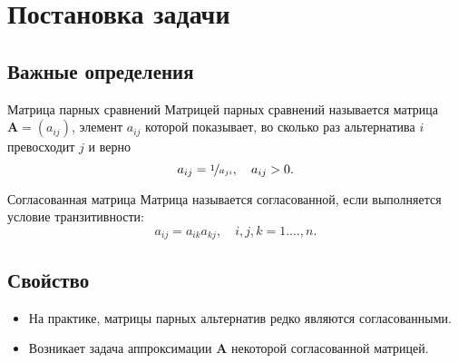 \documentclass[ucs, notheorems, handout]{beamer}
\begin{document}
\section{Постановка задачи}
\subsection{Важные определения}
\begin{frame}
	\begin{block}{Матрица парных сравнений}
		Матрицей парных сравнений называется матрица $\boldsymbol{A} = (a_{ij})$, элемент $a_{ij}$ которой показывает, во сколько раз альтернатива $i$ превосходит $j$ и верно
		\[
		a_{ij} = \nicefrac{1}{a_{ji}}, \quad a_{ij} > 0.
		\]
	\end{block}
	\begin{block}{Согласованная матрица}
		Матрица называется согласованной, если выполняется условие транзитивности:
		$$
		a_{i j}=a_{i k} a_{k j}, \quad i,j,k = 1. \dots, n.
		$$
	\end{block}
\end{frame}

\subsection{Свойство}
\begin{frame}
	\begin{itemize}
	\begin{block}{Вектор альтернатив}
	В случае, если матрица парных сравнений $\mathbf{A}$ является согласованной, то выполняется [Saaty, 1984]:
	$$
		\exists \mathbf{x} > 0: a_{ij} = x_{i}/x_{j} \quad \forall i, j.
	$$
	\end{block}
	\item На практике, матрицы парных альтернатив редко являются согласованными.
	\item Возникает задача аппроксимации $\mathbf{A}$ некоторой согласованной матрицей.
	\end{itemize}
\end{frame}
\end{document}
